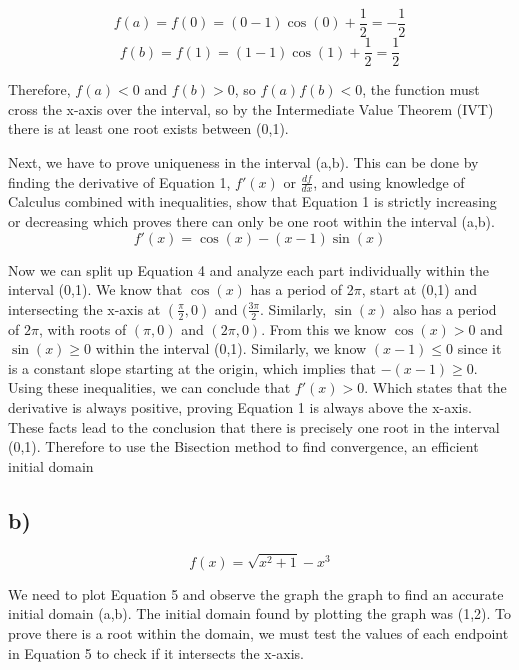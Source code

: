 \documentclass{article}
\begin{document}
    \begin{equation}
         f(a) = f(0) = (0-1)\cos(0)+\frac{1}{2} = -\frac{1}{2} 
    \end{equation}
    \begin{equation}
         f(b) = f(1) = (1-1)\cos(1)+\frac{1}{2} = \frac{1}{2} 
    \end{equation}
    
    Therefore, $f(a) < 0$ and $f(b) > 0$, so $f(a)f(b) < 0$, the function must cross the x-axis over the interval, so by the Intermediate Value Theorem (IVT) there is at least one root exists between (0,1).

    Next, we have to prove uniqueness in the interval (a,b).  This can be done by finding the derivative of Equation 1, $f'(x)$ or $\frac{df}{dx}$, and using knowledge of Calculus combined with inequalities, show that Equation 1 is strictly increasing or decreasing which proves there can only be one root within the interval (a,b).
   \begin{equation}
            f'(x) = \cos(x) - (x-1)\sin(x) 
   \end{equation}

    Now we can split up Equation 4 and analyze each part individually within the interval (0,1).  We know that $\cos(x)$ has a period of 2$\pi$, start at (0,1) and intersecting the x-axis at $(\frac{\pi}{2},0)$ and $(\frac{3\pi}{2}$.  Similarly, $\sin(x)$ also has a period of $2\pi$, with roots of $(\pi, 0)$ and $(2\pi,0)$. From this we know $\cos(x) > 0$ and $\sin(x) \ge 0$ within the interval (0,1).  Similarly, we know $(x-1) \le 0$ since it is a constant slope starting at the origin, which implies that $-(x-1) \ge 0$.  Using these inequalities, we can conclude that $f'(x) > 0$.  Which states that the derivative is always positive, proving Equation 1 is always above the x-axis.  These facts lead to the conclusion that there is precisely one root in the interval (0,1).  Therefore to use the Bisection method to find convergence, an efficient initial domain 

\subsection*{b)}
    \begin{equation}
             f(x) = \sqrt{x^2+1} -x^3
    \end{equation}

    We need to plot Equation 5 and observe the graph the graph to find an accurate initial domain (a,b).  The initial domain found by plotting the graph was (1,2).  To prove there is a root within the domain, we must test the values of each endpoint in Equation 5 to check if it intersects the x-axis.
\end{document}
